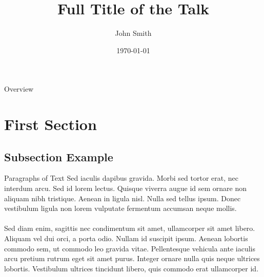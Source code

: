 \documentclass{beamer}
\title[Short title]{Full Title of the Talk}
\author{John Smith} %
\institute[UCLA] 
{
University of California \\ %
\medskip
\textit{john@smith.com} %
}
\date{\today} %
\begin{document}
\begin{frame}
\titlepage %
\end{frame}

\begin{frame}{Overview} 
\tableofcontents 
\end{frame}


\section{First Section} %

\subsection{Subsection Example} %

\begin{frame}{Paragraphs of Text}
Sed iaculis dapibus gravida. Morbi sed tortor erat, nec interdum arcu. Sed id lorem lectus. Quisque viverra augue id sem ornare non aliquam nibh tristique. Aenean in ligula nisl. Nulla sed tellus ipsum. Donec vestibulum ligula non lorem vulputate fermentum accumsan neque mollis.\\~\\

Sed diam enim, sagittis nec condimentum sit amet, ullamcorper sit amet libero. Aliquam vel dui orci, a porta odio. Nullam id suscipit ipsum. Aenean lobortis commodo sem, ut commodo leo gravida vitae. Pellentesque vehicula ante iaculis arcu pretium rutrum eget sit amet purus. Integer ornare nulla quis neque ultrices lobortis. Vestibulum ultrices tincidunt libero, quis commodo erat ullamcorper id.
\end{frame}
\end{document}
